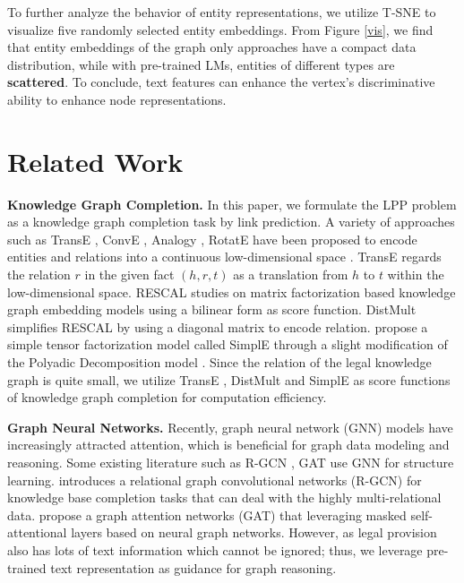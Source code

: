 \documentclass[runningheads]{llncs}
\begin{document}
To further analyze the behavior of entity representations, we utilize T-SNE \cite{maaten2008visualizing} to visualize five randomly selected entity embeddings. From Figure \ref{vis}, we find that entity embeddings of the graph only approaches have a compact data distribution, while with pre-trained LMs, entities of different types are \textbf{scattered}.    To conclude, text features can enhance the vertex's discriminative ability to enhance node representations. 

\section{Related Work}
\textbf{Knowledge Graph Completion.}
In this paper, we formulate the LPP problem as a knowledge graph completion task by link prediction. A variety of  approaches such as TransE \cite{TransE:conf/nips/BordesUGWY13}, ConvE \cite{ConvE:conf/aaai/DettmersMS018}, Analogy \cite{ANALOGY:conf/icml/LiuWY17}, RotatE \cite{RotatE:Sun2019RotatE} have been proposed to encode entities and relations into a continuous low-dimensional space \cite{zhang2020relation}. TransE \cite{TransE:conf/nips/BordesUGWY13}  regards the relation $r$ in the given fact $(h, r, t)$ as a translation from $h$ to $t$ within the low-dimensional space. RESCAL \cite{RESCAL:conf/icml/NickelTK11}  studies on matrix factorization based knowledge graph embedding models using a bilinear form as score function.  DistMult \cite{DistMult:conf/iclr/2015} simplifies RESCAL by using a diagonal matrix to encode relation.
\cite{kazemi2018simple} propose a simple tensor factorization model called SimplE through a slight modification of the Polyadic Decomposition model \cite{hitchcock1927expression}. Since the relation of the legal knowledge graph is quite small, we utilize TransE \cite{TransE:conf/nips/BordesUGWY13}, DistMult \cite{DistMult:conf/iclr/2015} and SimplE \cite{kazemi2018simple} as score functions of knowledge graph completion for computation efficiency.

\textbf{Graph Neural Networks.} 
Recently, graph neural network (GNN) models have increasingly attracted attention, which is beneficial for graph data modeling and reasoning. Some existing literature such as   R-GCN \cite{schlichtkrull2018modeling},  GAT \cite{velickovic2018graph} use GNN for structure learning. 
\cite{schlichtkrull2018modeling} introduces a relational graph convolutional networks (R-GCN) for knowledge base completion tasks that can deal with the highly multi-relational data.
\cite{velickovic2018graph}  propose a graph attention networks (GAT) that leveraging masked self-attentional layers based on neural graph networks.
However, as legal provision also has lots of text information which cannot be ignored; thus, we leverage pre-trained text representation as guidance for graph reasoning. 
\end{document}
